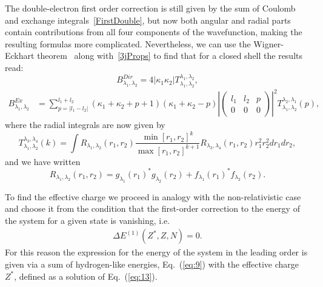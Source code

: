 The double-electron first order correction is still given by the sum of Coulomb and exchange integrals~\eqref{FirstDouble}, but now both angular and radial parts contain contributions from all four components of the wavefunction, making the resulting formulas more complicated. Nevertheless, we can use the Wigner-Eckhart theorem~\cite{sakurai2020modern} along with~\eqref{3jProps} to find that for a closed shell the results read:
\begin{equation}
    B^{Dir}_{\lambda_1,\lambda_2} = 4 |\kappa_1 \kappa_2| T_{\lambda_1,\lambda_2}^{\lambda_1,\lambda_2},
\end{equation}
\begin{align}
    B^{Ex}_{\lambda_1,\lambda_2} &= \sum_{p=|l_1-l_2|}^{l_1+l_2}(\kappa_1+\kappa_2+p+1)(\kappa_1+\kappa_2-p) %
    \left| \begin{pmatrix} l_1 & l_2 & p \\ 0 & 0 & 0\end{pmatrix}\right|^2 T_{\lambda_1,\lambda_2}^{\lambda_2,\lambda_1}(p),
\end{align}
where the radial integrals are now given by
\begin{equation}
  T_{\lambda_1,\lambda_2}^{\lambda_3,\lambda_4} (k) = \int R_{\lambda_1,\lambda_2}(r_1,r_2)\frac{\min[r_1,r_2]^k}{\max[r_1,r_2]^{k+1}}R_{\lambda_3,\lambda_4}(r_1,r_2)r_1^2 r_2^2 dr_1 dr_2,
\end{equation}
and we have written
\begin{equation}
    R_{\lambda_1,\lambda_2}(r_1,r_2) = g_{\lambda_1}(r_1)^*g_{\lambda_2}(r_2)+f_{\lambda_1}(r_1)^*f_{\lambda_2}(r_2).
\end{equation}

To find the effective charge we proceed in analogy with
the non-relativistic case and choose it from the condition
that the first-order correction to the energy of the system for a
given state is vanishing, i.e.
\begin{align}
  \Delta E^{(1)}(Z^*, Z, N) = 0. \label{eq:13}
\end{align}
For this reason the expression for the energy of the system in
the leading order is given via a sum of hydrogen-like
energies, Eq.~(\ref{eq:9}) with the effective charge $Z^{*}$, defined
as a solution of Eq.~(\ref{eq:13}).

